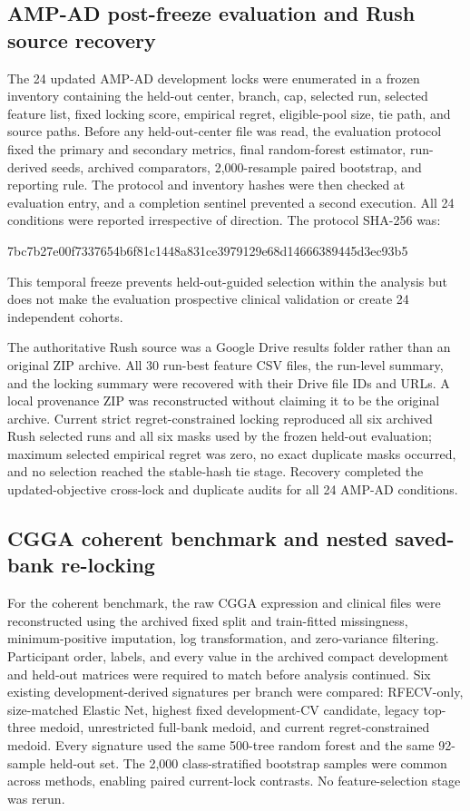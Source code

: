 \subsection{AMP-AD post-freeze evaluation and Rush source recovery}

The 24 updated AMP-AD development locks were enumerated in a frozen inventory containing the held-out center, branch, cap, selected run, selected feature list, fixed locking score, empirical regret, eligible-pool size, tie path, and source paths. Before any held-out-center file was read, the evaluation protocol fixed the primary and secondary metrics, final random-forest estimator, run-derived seeds, archived comparators, 2,000-resample paired bootstrap, and reporting rule. The protocol and inventory hashes were then checked at evaluation entry, and a completion sentinel prevented a second execution. All 24 conditions were reported irrespective of direction. The protocol SHA-256 was:
\begin{center}\scriptsize\ttfamily 7bc7b27e00f7337654b6f81c1448a831ce3979129e68d14666389445d3ec93b5\end{center}
This temporal freeze prevents held-out-guided selection within the analysis but does not make the evaluation prospective clinical validation or create 24 independent cohorts.

The authoritative Rush source was a Google Drive results folder rather than an original ZIP archive. All 30 run-best feature CSV files, the run-level summary, and the locking summary were recovered with their Drive file IDs and URLs. A local provenance ZIP was reconstructed without claiming it to be the original archive. Current strict regret-constrained locking reproduced all six archived Rush selected runs and all six masks used by the frozen held-out evaluation; maximum selected empirical regret was zero, no exact duplicate masks occurred, and no selection reached the stable-hash tie stage. Recovery completed the updated-objective cross-lock and duplicate audits for all 24 AMP-AD conditions.

\subsection{CGGA coherent benchmark and nested saved-bank re-locking}

For the coherent benchmark, the raw CGGA expression and clinical files were reconstructed using the archived fixed split and train-fitted missingness, minimum-positive imputation, log transformation, and zero-variance filtering. Participant order, labels, and every value in the archived compact development and held-out matrices were required to match before analysis continued. Six existing development-derived signatures per branch were compared: RFECV-only, size-matched Elastic Net, highest fixed development-CV candidate, legacy top-three medoid, unrestricted full-bank medoid, and current regret-constrained medoid. Every signature used the same 500-tree random forest and the same 92-sample held-out set. The 2,000 class-stratified bootstrap samples were common across methods, enabling paired current-lock contrasts. No feature-selection stage was rerun.

